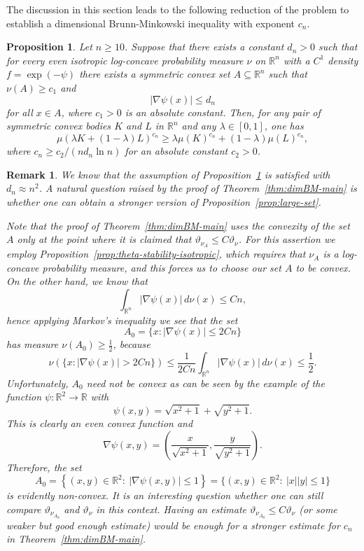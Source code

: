 \documentclass[11pt,leqno]{article}
\newtheorem{proposition}[theorem]{Proposition}
\newtheorem{remark}[theorem]{Remark}
\theoremstyle{definition}
\theoremstyle{remark}
\numberwithin{equation}{section}
\newcommand{\ls}{\leqslant}
\newcommand{\gr}{\geqslant}
\newcommand{\1}{\textbf{1}}
\newcommand{\R}{\mathbb{R}}
\begin{document}
The discussion in this section leads to the following reduction of the problem to establish a dimensional Brunn-Minkowski inequality with exponent $c_n$.

\begin{proposition}\label{prop:reduction}Let $n\gr 10$. Suppose that there exists a constant $d_n>0$ such that for every even isotropic 
log-concave probability measure $\nu$ on $\mathbb{R}^n$ with a $C^1$ density $f=\exp(-\psi)$ there exists a symmetric convex set 
$A\subseteq\mathbb{R}^n$ such that $\nu(A)\gr c_1$ and
$$|\nabla\psi(x)|\ls d_n$$
for all $x\in A$, where $c_1>0$ is an absolute constant. Then, for any pair of symmetric convex bodies
$K$ and $L$ in $\mathbb{R}^n$ and any $\lambda\in [0,1]$, one has
$$\mu(\lambda K+(1-\lambda)L)^{c_n}\gr\lambda \mu(K)^{c_n}+(1-\lambda)\mu(L)^{c_n},$$
where $c_n\gr c_2/(nd_n\ln n)$ for an absolute constant $c_2>0$.
\end{proposition}

\begin{remark}\label{rem:better}\rm We know that the assumption of Proposition~\ref{prop:reduction} is satisfied with $d_n\approx n^2$. A natural question raised by the proof of
Theorem~\ref{thm:dimBM-main} is whether one can obtain a stronger version of Proposition~\ref{prop:large-set}.

Note that the proof of Theorem~\ref{thm:dimBM-main} uses the convexity of the set $A$ only at the point where it is claimed that
$\vartheta_{\nu_A}\ls C\vartheta_{\nu}$. For this assertion we employ Proposition~\ref{prop:theta-stability-isotropic}, which requires
that $\nu_A$ is a log-concave probability measure, and this forces us to choose our set $A$ to be convex. On the other hand, we know that
$$\int_{\mathbb{R}^n} |\nabla \psi(x)|\, d\nu(x) \ls Cn,$$
hence applying Markov's inequality we see that the set 
$$A_0=\{x:|\nabla\psi(x)|\ls 2Cn\}$$ has measure $\nu(A_0)\gr\frac{1}{2}$, because
$$\nu(\{x:|\nabla\psi(x)|>2Cn\})\ls\frac{1}{2Cn}\int_{\mathbb{R}^n}|\nabla\psi (x)|\,d\nu(x)\ls \frac{1}{2}.$$
Unfortunately, $A_0$ need not be convex as can be seen by the example of the function $\psi:\R^2\to\R$ with
$$\psi(x,y) = \sqrt{x^2+1}+\sqrt{y^2+1}.$$ 
This is clearly an even convex function and
$$\nabla \psi(x,y) = \left(\frac{x}{\sqrt{x^2+1}}, \frac{y}{\sqrt{y^2+1}}\right).$$
Therefore, the set
$$A_0 = \left\{ (x,y)\in\R^2: \ |\nabla\psi(x,y)|\ls 1\right\} = \{(x,y)\in\R^2: \ |x||y| \ls 1\}$$
is evidently non-convex. It is an interesting question whether one can still compare $\vartheta_{\nu_{A_0}}$ and $\vartheta_{\nu}$ in this context. 
Having an estimate $\vartheta_{\nu_{A_0}}\ls C\vartheta_{\nu}$ (or some weaker but good enough estimate) would be enough for a
stronger estimate for $c_n$ in Theorem~\ref{thm:dimBM-main}.
\end{remark}
\end{document}
